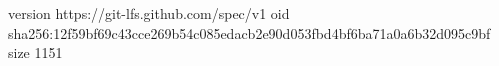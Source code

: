version https://git-lfs.github.com/spec/v1
oid sha256:12f59bf69c43cce269b54c085edacb2e90d053fbd4bf6ba71a0a6b32d095c9bf
size 1151
